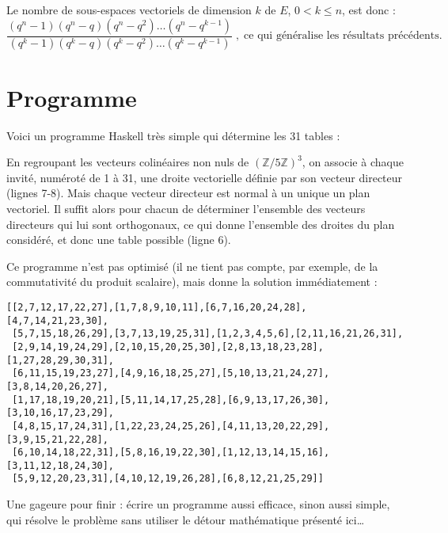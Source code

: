 \documentclass[a4paper,11pt]{article}
\newcommand{\Z}{\ensuremath{\mathbb{Z}}\xspace}
\begin{document}
Le nombre de sous-espaces vectoriels de dimension $k$ de $E$,
$0<k\le n$, est donc :
\[
  \frac{(q^n-1)(q^n-q)(q^n-q^2)\ldots(q^n-q^{k-1})}%
       {(q^k-1)(q^k-q)(q^k-q^2)\ldots(q^k-q^{k-1})} \;,\;
  \mbox{ce qui généralise les résultats précédents.}
\]

\section{Programme}

Voici un programme Haskell très simple qui détermine les 31 tables :

\bigskip
\lstset{basicstyle=\ttfamily\small, frame=single, numbers=left, numberstyle=\tiny}


\medskip
En regroupant les vecteurs colinéaires non nuls de $(\Z/5\Z)^3$,
on associe à chaque invité, numéroté de 1 à 31, une droite vectorielle
définie par son vecteur directeur (lignes 7-8).
Mais chaque vecteur directeur est normal à un unique un plan vectoriel. Il
suffit alors pour chacun de déterminer l'ensemble des vecteurs directeurs
qui lui sont orthogonaux, ce qui donne l'ensemble des droites
du plan considéré, et donc une table possible (ligne 6).

Ce programme n'est pas optimisé (il ne tient pas compte, par exemple,
de la commutativité du produit scalaire), mais donne la solution
immédiatement :

\medskip
\lstset{basicstyle=\ttfamily\small, frame=none, numbers=none}
\begin{lstlisting}
[[2,7,12,17,22,27],[1,7,8,9,10,11],[6,7,16,20,24,28],[4,7,14,21,23,30],
 [5,7,15,18,26,29],[3,7,13,19,25,31],[1,2,3,4,5,6],[2,11,16,21,26,31],
 [2,9,14,19,24,29],[2,10,15,20,25,30],[2,8,13,18,23,28],[1,27,28,29,30,31],
 [6,11,15,19,23,27],[4,9,16,18,25,27],[5,10,13,21,24,27],[3,8,14,20,26,27],
 [1,17,18,19,20,21],[5,11,14,17,25,28],[6,9,13,17,26,30],[3,10,16,17,23,29],
 [4,8,15,17,24,31],[1,22,23,24,25,26],[4,11,13,20,22,29],[3,9,15,21,22,28],
 [6,10,14,18,22,31],[5,8,16,19,22,30],[1,12,13,14,15,16],[3,11,12,18,24,30],
 [5,9,12,20,23,31],[4,10,12,19,26,28],[6,8,12,21,25,29]]
\end{lstlisting}

\medskip
Une gageure pour finir : écrire un programme aussi efficace, sinon aussi
simple, qui résolve le problème sans utiliser le détour mathématique
présenté ici\dots
\end{document}
